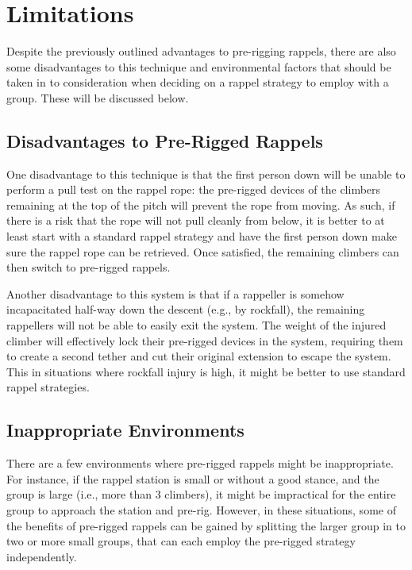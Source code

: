 \documentclass[nonacm,acmtog]{acmart}
\begin{document}

\section{Limitations}
\label{sec:limitations}

  Despite the previously outlined advantages to pre-rigging rappels, there are
  also some disadvantages to this technique and environmental factors that
  should be taken in to consideration when deciding on a rappel strategy to
  employ with a group.  These will be discussed below.

\subsection{Disadvantages to Pre-Rigged Rappels}

  One disadvantage to this technique is that the first person down will be
  unable to perform a pull test on the rappel rope: the pre-rigged devices of
  the climbers remaining at the top of the pitch will prevent the rope from
  moving.  As such, if there is a risk that the rope will not pull cleanly from
  below, it is better to at least start with a standard rappel strategy and
  have the first person down make sure the rappel rope can be retrieved.  Once
  satisfied, the remaining climbers can then switch to pre-rigged rappels.

  Another disadvantage to this system is that if a rappeller is somehow
  incapacitated half-way down the descent (e.g., by rockfall), the remaining
  rappellers will not be able to easily exit the system.  The weight of the
  injured climber will effectively lock their pre-rigged devices in the system,
  requiring them to create a second tether and cut their original extension to
  escape the system.  This in situations where rockfall injury is high, it
  might be better to use standard rappel strategies.

\subsection{Inappropriate Environments}

   There are a few environments where pre-rigged rappels might be
   inappropriate.  For instance, if the rappel station is small or without a
   good stance, and the group is large (i.e., more than 3 climbers), it might
   be impractical for the entire group to approach the station and pre-rig.
   However, in these situations, some of the benefits of pre-rigged rappels can
   be gained by splitting the larger group in to two or more small groups, that
   can each employ the pre-rigged strategy independently.
\end{document}
